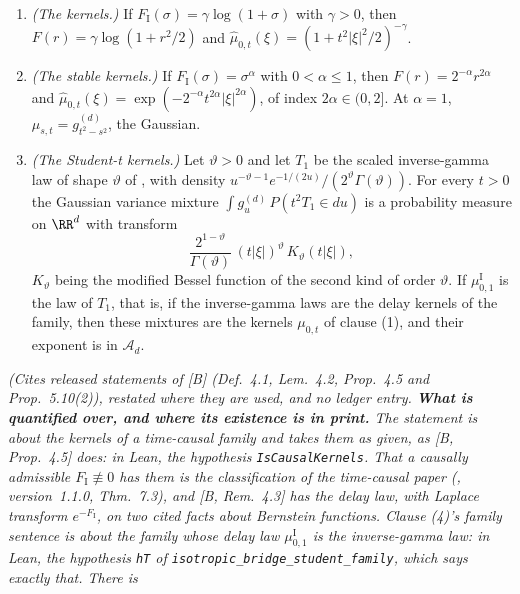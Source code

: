 \begin{proposition}
\begin{enumerate}
$S_\lambda t = \lambda t$, and
$\widehat\mu_{s,t}(\xi) = \exp[-(F(t|\xi|) - F(s|\xi|))]$: it is the family of
\ref{thm:isotropic-classification} with gauge $\chi = \mathrm{id}$ and exponent $F$, and
$F \in \mathcal{A}_d$, for every $d \ge 1$.
\item \emph{(The \Matern{} kernels.)} If $F_{\mathrm I}(\sigma) = \gamma\log(1+\sigma)$ with
$\gamma > 0$, then $F(r) = \gamma\log(1 + r^2/2)$ and
$\widehat\mu_{0,t}(\xi) = (1 + t^2|\xi|^2/2)^{-\gamma}$.
\item \emph{(The stable kernels.)} If $F_{\mathrm I}(\sigma) = \sigma^\alpha$ with
$0 < \alpha \le 1$, then $F(r) = 2^{-\alpha}r^{2\alpha}$ and
$\widehat\mu_{0,t}(\xi) = \exp(-2^{-\alpha}t^{2\alpha}|\xi|^{2\alpha})$, of index
$2\alpha \in (0,2]$. At $\alpha = 1$, $\mu_{s,t} = g^{(d)}_{t^2-s^2}$, the Gaussian.
\item \emph{(The Student-t kernels.)} Let $\vartheta > 0$ and let $T_1$ be the scaled
inverse-gamma law of shape $\vartheta$ of , with density
$u^{-\vartheta-1}e^{-1/(2u)}/(2^\vartheta\Gamma(\vartheta))$. For every
$t > 0$ the Gaussian variance mixture $\int g^{(d)}_u\,P(t^2T_1 \in du)$ is a probability measure
on $\RR^d$ with transform
\[
  \frac{2^{1-\vartheta}}{\Gamma(\vartheta)}\,(t|\xi|)^\vartheta\,K_\vartheta(t|\xi|) ,
\]
$K_\vartheta$ being the modified Bessel function of the second kind of order $\vartheta$.
If $\mu^{\mathrm I}_{0,1}$ is the law of $T_1$, that is, if the inverse-gamma laws are the
delay kernels of the family, then these mixtures are the kernels $\mu_{0,t}$ of
clause (1), and their exponent is in $\mathcal{A}_d$.
\end{enumerate}
\statusT\quad\emph{(Cites released statements of [B] (Def.~4.1, Lem.~4.2, Prop.~4.5 and
Prop.~5.10(2)), restated where they are used, and no ledger entry. \textbf{What is quantified
over, and where its existence is in print.} The statement is about the kernels of a time-causal
family and takes them as given, as [B, Prop.~4.5] does: in Lean, the hypothesis
\texttt{IsCausalKernels}. That a causally admissible $F_{\mathrm I} \not\equiv 0$ has them is the
classification of the time-causal paper (, version~1.1.0,
Thm.~7.3), and [B, Rem.~4.3] has the delay law, with Laplace transform $e^{-F_{\mathrm I}}$, on
two cited facts about Bernstein functions. Clause (4)'s family sentence is about the family whose
delay law $\mu^{\mathrm I}_{0,1}$ is the inverse-gamma law: in Lean, the hypothesis
\texttt{hT} of \texttt{isotropic\_bridge\_student\_family}, which says exactly that. There is
}
\end{proposition}
